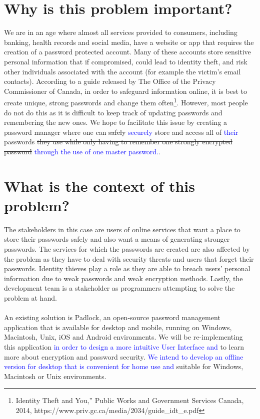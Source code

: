 \documentclass{article}
\begin{document}
\section{Why is this problem important?}
We are in an age where almost all services provided to consumers, including banking, health records and social media, have a website or app that requires the creation of a password protected account. Many of these accounts store sensitive personal information that if compromised, could lead to identity theft, and risk other individuals associated with the account (for example the victim’s email contacts). According to a guide released by The Office of the Privacy Commissioner of Canada, in order to safeguard information online, it is best to create unique, strong passwords and change them often\footnote{Identity Theft and You,” Public Works and Government Services Canada, 2014,  https://www.priv.gc.ca/media/2034/guide\_idt\_e.pdf}. However, most people do not do this as it is difficult to keep track of updating passwords and remembering the new ones. We hope to facilitate this issue by creating a password manager where one can \sout{safely} \textcolor{blue}{securely} store and access all of \textcolor{blue}{their} passwords \sout{they use while only having to remember one strongly encrypted password} \textcolor{blue}{through the use of one master password.}.

\section{What is the context of this problem?}
The stakeholders in this case are users of online services that want a place to store their passwords safely and also want a means of generating stronger passwords. The services for which the passwords are created are also affected by the problem as they have to deal with security threats and users that forget their passwords. Identity thieves play a role as they are able to breach users’ personal information due to weak passwords and weak encryption methods. Lastly, the development team is a stakeholder as programmers attempting to solve the problem at hand. \\
\\
An existing solution is Padlock, an open-source password management application that is available for desktop and mobile, running on Windows, Macintosh, Unix, iOS and Android environments. We will be re-implementing this application \textcolor{blue}{in order to design a more intuitive User Interface and} to learn more about encryption and password security. \textcolor{blue}{We intend to develop an offline version for desktop that is convenient for home use and} suitable for Windows, Macintosh or Unix environments. 
\end{document}
